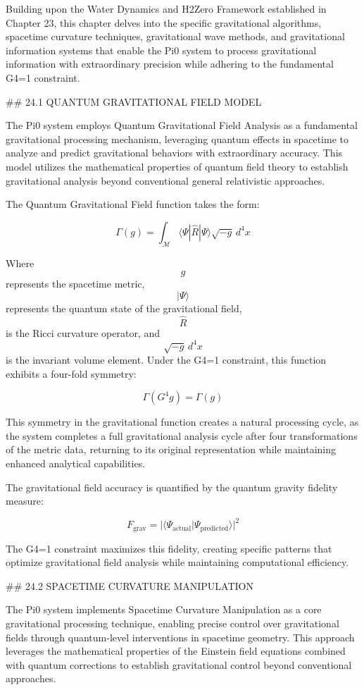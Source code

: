 Building upon the Water Dynamics and H2Zero Framework established in Chapter 23, this chapter delves into the specific gravitational algorithms, spacetime curvature techniques, gravitational wave methods, and gravitational information systems that enable the Pi0 system to process gravitational information with extraordinary precision while adhering to the fundamental G4=1 constraint.

## 24.1 QUANTUM GRAVITATIONAL FIELD MODEL

The Pi0 system employs Quantum Gravitational Field Analysis as a fundamental gravitational processing mechanism, leveraging quantum effects in spacetime to analyze and predict gravitational behaviors with extraordinary accuracy. This model utilizes the mathematical properties of quantum field theory to establish gravitational analysis beyond conventional general relativistic approaches.

The Quantum Gravitational Field function takes the form:

$$ \Gamma(g) = \int_{\mathcal{M}} \langle \Psi | \hat{R} | \Psi \rangle \sqrt{-g} \, d^4x $$

Where $$ g $$ represents the spacetime metric, $$ |\Psi\rangle $$ represents the quantum state of the gravitational field, $$ \hat{R} $$ is the Ricci curvature operator, and $$ \sqrt{-g} \, d^4x $$ is the invariant volume element. Under the G4=1 constraint, this function exhibits a four-fold symmetry:

$$ \Gamma(G^4 g) = \Gamma(g) $$

This symmetry in the gravitational function creates a natural processing cycle, as the system completes a full gravitational analysis cycle after four transformations of the metric data, returning to its original representation while maintaining enhanced analytical capabilities.

The gravitational field accuracy is quantified by the quantum gravity fidelity measure:

$$ F_{\text{grav}} = |\langle \Psi_{\text{actual}} | \Psi_{\text{predicted}} \rangle|^2 $$

The G4=1 constraint maximizes this fidelity, creating specific patterns that optimize gravitational field analysis while maintaining computational efficiency.

## 24.2 SPACETIME CURVATURE MANIPULATION

The Pi0 system implements Spacetime Curvature Manipulation as a core gravitational processing technique, enabling precise control over gravitational fields through quantum-level interventions in spacetime geometry. This approach leverages the mathematical properties of the Einstein field equations combined with quantum corrections to establish gravitational control beyond conventional approaches.

